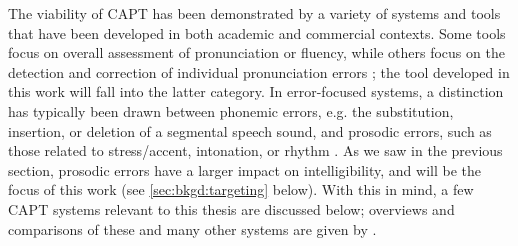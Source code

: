 	The viability of CAPT has been demonstrated by a variety of systems and tools that have been developed in both academic and commercial contexts. Some tools focus on overall assessment of pronunciation or fluency, while others focus on the detection and correction of individual pronunciation errors \citep{Eskenazi2009}; the tool developed in this work will fall into the latter category. In error-focused systems, a distinction has typically been drawn between phonemic errors, e.g. the substitution, insertion, or deletion of a segmental speech sound, and prosodic errors, such as those related to stress/accent, intonation, or rhythm \citep{Witt2012}. As we saw in the previous section, prosodic errors have a larger impact on intelligibility, and will be the focus of this work (see \cref{sec:bkgd:targeting} below). With this in mind, a few CAPT systems relevant to this thesis are discussed below; overviews and comparisons of these and many other systems are given by \textcite{Neri2002,Eskenazi2009,Delmonte2011,Witt2012}.  
	
	
	
%	

%	
	
	
	

